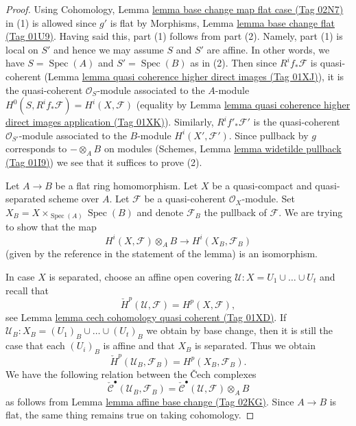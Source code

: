 \documentclass{amsart}
\theoremstyle{plain}
\theoremstyle{definition}
\theoremstyle{remark}
\numberwithin{equation}{subsection}
\def\Spec{\mathop{\mathrm{Spec}}}
\begin{document}
\begin{proof}
Using Cohomology, Lemma \href{https://stacks.math.columbia.edu/tag/02N7}{lemma base change map flat case (Tag 02N7)} in (1)
is allowed since $g'$ is flat by
Morphisms, Lemma \href{https://stacks.math.columbia.edu/tag/01U9}{lemma base change flat (Tag 01U9)}.
Having said this, part (1) follows from part (2). Namely,
part (1) is local on $S'$ and hence we may assume $S$
and $S'$ are affine. In other words, we have $S = \Spec(A)$
and $S' = \Spec(B)$ as in (2).
Then since $R^if_*\mathcal{F}$ is quasi-coherent
(Lemma \href{https://stacks.math.columbia.edu/tag/01XJ}{lemma quasi coherence higher direct images (Tag 01XJ)}),
it is the quasi-coherent $\mathcal{O}_S$-module associated to the
$A$-module $H^0(S, R^if_*\mathcal{F}) = H^i(X, \mathcal{F})$
(equality by
Lemma \href{https://stacks.math.columbia.edu/tag/01XK}{lemma quasi coherence higher direct images application (Tag 01XK)}).
Similarly, $R^if'_*\mathcal{F}'$ is the quasi-coherent
$\mathcal{O}_{S'}$-module associated to the $B$-module
$H^i(X', \mathcal{F}')$. Since pullback by $g$ corresponds
to $- \otimes_A B$ on modules
(Schemes, Lemma \href{https://stacks.math.columbia.edu/tag/01I9}{lemma widetilde pullback (Tag 01I9)})
we see that it suffices to prove (2).

\medskip\noindent
Let $A \to B$ be a flat ring homomorphism.
Let $X$ be a quasi-compact and quasi-separated scheme over $A$.
Let $\mathcal{F}$ be a quasi-coherent $\mathcal{O}_X$-module.
Set $X_B = X \times_{\Spec(A)} \Spec(B)$ and denote
$\mathcal{F}_B$ the pullback of $\mathcal{F}$.
We are trying to show that the map
$$
H^i(X, \mathcal{F}) \otimes_A B \longrightarrow H^i(X_B, \mathcal{F}_B)
$$
(given by the reference in the statement of the lemma)
is an isomorphism.

\medskip\noindent
In case $X$ is separated, choose an affine open covering
$\mathcal{U} : X = U_1 \cup \ldots \cup U_t$ and recall that
$$
\check{H}^p(\mathcal{U}, \mathcal{F}) = H^p(X, \mathcal{F}),
$$
see
Lemma \href{https://stacks.math.columbia.edu/tag/01XD}{lemma cech cohomology quasi coherent (Tag 01XD)}.
If $\mathcal{U}_B : X_B = (U_1)_B \cup \ldots \cup (U_t)_B$ we obtain
by base change, then it is still the case that each $(U_i)_B$ is affine
and that $X_B$ is separated. Thus we obtain
$$
\check{H}^p(\mathcal{U}_B, \mathcal{F}_B) = H^p(X_B, \mathcal{F}_B).
$$
We have the following relation between the {\v C}ech complexes
$$
\check{\mathcal{C}}^\bullet(\mathcal{U}_B, \mathcal{F}_B) =
\check{\mathcal{C}}^\bullet(\mathcal{U}, \mathcal{F}) \otimes_A B
$$
as follows from
Lemma \href{https://stacks.math.columbia.edu/tag/02KG}{lemma affine base change (Tag 02KG)}.
Since $A \to B$ is flat, the same thing remains true on taking cohomology.


\end{proof}
\end{document}
